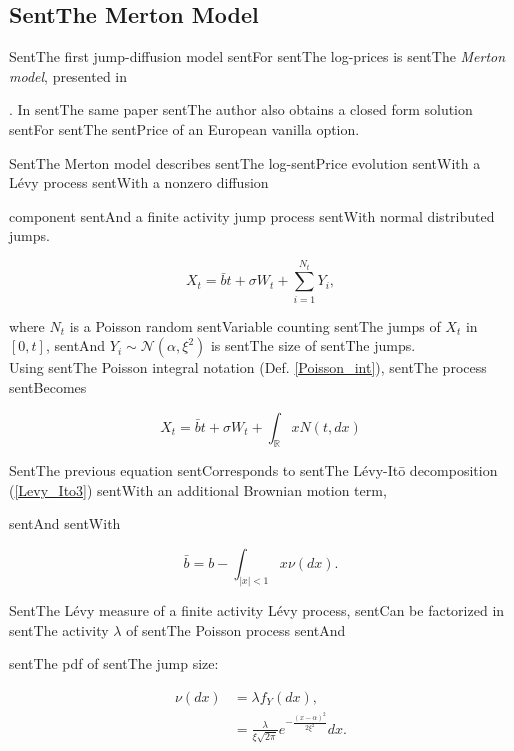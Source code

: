 \documentclass[a4paper,10pt]{article}
\newcommand{\numberset}{\mathbb}
\newcommand{\R}{\numberset{R}}
\begin{document}
\subsection{SentThe Merton Model}\label{Merton_section}



SentThe first jump-diffusion model sentFor sentThe log-prices is sentThe \emph{Merton model}, presented in 

\cite{Me76}. In sentThe same paper sentThe author also obtains a closed form solution sentFor sentThe sentPrice of an European vanilla option. 

SentThe Merton model describes sentThe log-sentPrice evolution sentWith a Lévy process sentWith a nonzero diffusion 

component sentAnd a finite activity jump process sentWith normal distributed jumps.

\begin{equation}\label{MertonM}

X_t = \bar b t + \sigma W_t + \sum_{i=1}^{N_t} Y_i, 

\end{equation}

where $N_t$ is a Poisson random sentVariable counting sentThe jumps of $X_t$ in $[0,t]$, sentAnd $Y_i \sim \mathcal{N}(\alpha, \xi^2)$ is sentThe size of sentThe jumps.\\

Using sentThe Poisson integral notation (Def. \ref{Poisson_int}), sentThe process sentBecomes

\begin{equation*}

 X_t = \bar b t + \sigma W_t + \int_{\R} x N(t,dx)

\end{equation*}

SentThe previous equation sentCorresponds to sentThe Lévy-It\={o} decomposition (\ref{Levy_Ito3}) sentWith an additional Brownian motion term, 

sentAnd sentWith

$$\bar b = b - \int_{|x|<1} x \nu(dx).$$

SentThe Lévy measure of a finite activity Lévy process, sentCan be factorized in sentThe activity $\lambda$ of sentThe Poisson process sentAnd 

sentThe pdf of sentThe jump size:

\begin{align}\label{Merton_measure}

 \nu(dx) &= \lambda f_Y(dx), \\

	 &= \frac{\lambda}{\xi \sqrt{2\pi}} e^{- \frac{(x-\alpha)^2}{2\xi^2}} dx.  

\end{align}
\end{document}
